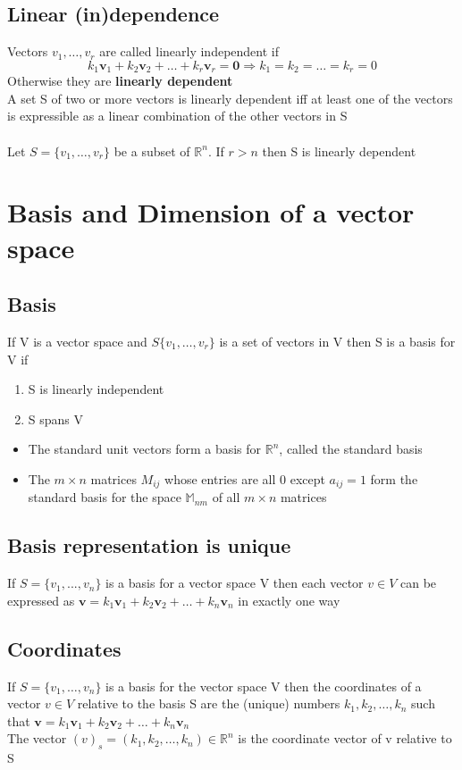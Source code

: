 \documentclass{article}[18pt]
\begin{document}
\subsection{Linear (in)dependence}
Vectors $v_1,\ldots,v_r$ are called linearly independent if
\[
k_{1} \mathbf{v}_{1}+k_{2} \mathbf{v}_{2}+\ldots+k_{r} \mathbf{v}_{r}=\mathbf{0} \Rightarrow k_{1}=k_{2}=\ldots=k_{r}=0
\]
Otherwise they are \textbf{linearly dependent}\\
A set S of two or more vectors is linearly dependent iff at least one of the vectors is expressible as a linear combination of the other vectors in S\\
\\
Let $S=\{v_1,\ldots,v_r\}$ be a subset of $\mathbb{R}^n$. If $r>n$ then S is linearly dependent
\section{Basis and Dimension of a vector space}
\subsection{Basis}
If V is a vector space and $S\{v_1,\ldots,v_r\}$ is a set of vectors in V then S is a basis for V if
\begin{enumerate}
	\item S is linearly independent
	\item S spans V
\end{enumerate}
\begin{itemize}
	\item The standard unit vectors form a basis for $\mathbb{R}^n$, called the standard basis
	\item The $m\times n$ matrices $M_{ij}$ whose entries are all 0 except $a_{ij}=1$ form the standard basis for the space $\mathbb{M}_{nm}$ of all $m\times n$ matrices
\end{itemize}
\subsection{Basis representation is unique}
If $S=\{v_1,...,v_n\}$ is a basis for a vector space V then each vector $v\in V$ can be expressed as \(\mathbf{v}=k_{1} \mathbf{v}_{1}+k_{2} \mathbf{v}_{2}+\ldots+k_{n} \mathbf{v}_{n}\) in exactly one way
\subsection{Coordinates}
If $S=\{v_1,\ldots,v_n\}$ is a basis for the vector space V then the coordinates of a vector $v\in V$ relative to the basis S are the (unique) numbers $k_1,k_2,\ldots,k_n$ such that \(\mathbf{v}=k_{1} \mathbf{v}_{1}+k_{2} \mathbf{v}_{2}+\ldots+k_{n} \mathbf{v}_{n}\)\\
The vector $(v)_s=(k_1,k_2,\ldots,k_n)\in \mathbb{R}^n$ is the coordinate vector of v relative to S
\end{document}
